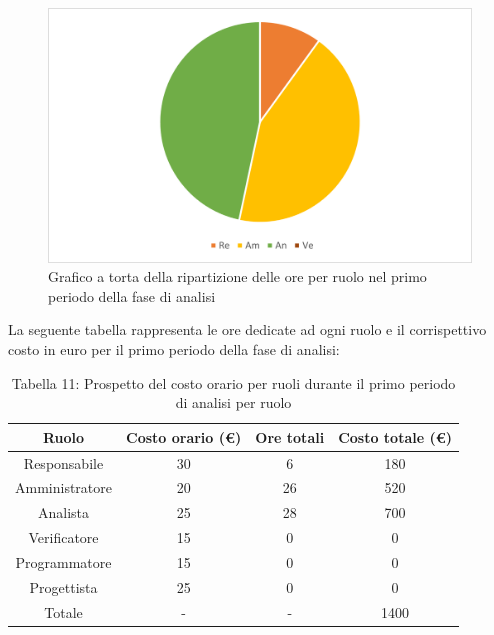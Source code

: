 \begin{figure}[H]
    \centering
    \includegraphics[scale=0.6]{img/grafi preventivo/torta/analisi/periodo1.png}
    \caption{Grafico a torta della ripartizione delle ore per ruolo nel primo periodo della fase di analisi}
\end{figure}
La seguente tabella rappresenta le ore dedicate ad ogni ruolo e il corrispettivo costo in euro per il primo periodo della fase di analisi:
\begin{table}[H]
	\setlength\extrarowheight{5pt}
	\centering
	\begin{tabularx}{\textwidth}{|ccc|c|}
		\hline
		\rowcolor{white}
		\textbf{Ruolo} & \textbf{Costo orario (€)} & \textbf{Ore totali} & \textbf{Costo totale (€)} \\
		\hline
		Responsabile &30&6&180 \\
		Amministratore &20&26&520 \\
		Analista &25&28&700 \\
		Verificatore &15&0&0 \\
		Programmatore &15&0&0 \\
		Progettista &25&0&0 \\
		\hline
		Totale &-&-&1400 \\
		\hline
	\end{tabularx}
    \vspace{10pt}
	\caption{Tabella 11: Prospetto del costo orario per ruoli durante il primo periodo di analisi per ruolo}
\end{table}
